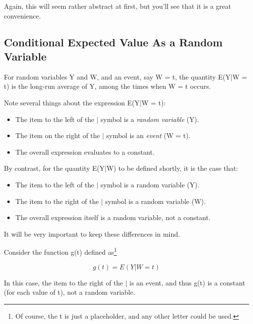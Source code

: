 \documentclass[11pt]{article}
\begin{document}
Again, this will seem rather abstract at first, but you'll see that it
is a great convenience.

\subsection{Conditional Expected Value As a Random Variable}

For random variables Y and W, and an event, say W = t, the quantity
E(Y$|$W = t) is the long-run average of Y, among the times when W = t
occurs.  

Note several things about the expression E(Y$|$W = t):

\begin{itemize}

\item The item to the left of the $|$ symbol is a {\it random variable} (Y).

\item The item on the right of the $|$ symbol is an {\it event} (W = t).

\item The overall expression evaluates to a constant.

\end{itemize}

By contrast, for the quantity E(Y$|$W) to be defined shortly,
it is the case that:

\begin{itemize}

\item The item to the left of the $|$ symbol is a random variable (Y).

\item The item to the right of the $|$ symbol is a random variable (W).

\item The overall expression itself is a random variable, not a constant.

\end{itemize}

It will be very important to keep these differences in mind.

Consider the function g(t) defined as\footnote{Of course, the t is just
a placeholder, and any other letter could be used.} 

\begin{equation}
\label{thisisg}
g(t)=E(Y|W=t)
\end{equation}

In this case, the item to the right of the $|$ is an event, and thus
g(t) is a constant (for each value of t), not a random variable.
\end{document}
